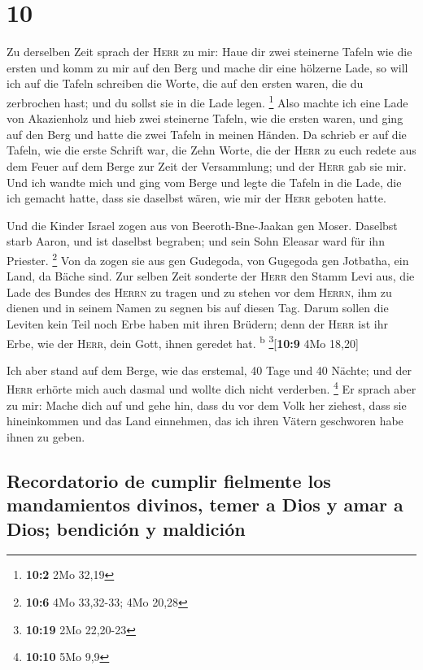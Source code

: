 \hypertarget{section-9}{%
\section{10}\label{section-9}}

 Zu derselben Zeit sprach der \textsc{Herr} zu mir: Haue
dir zwei steinerne Tafeln wie die ersten und komm zu mir auf den Berg
und mache dir eine hölzerne Lade,  so will ich auf die
Tafeln schreiben die Worte, die auf den ersten waren, die du zerbrochen
hast; und du sollst sie in die Lade legen. \footnote{\textbf{10:2} 2Mo
  32,19}  Also machte ich eine Lade von Akazienholz und
hieb zwei steinerne Tafeln, wie die ersten waren, und ging auf den Berg
und hatte die zwei Tafeln in meinen Händen.  Da schrieb er
auf die Tafeln, wie die erste Schrift war, die Zehn Worte, die der
\textsc{Herr} zu euch redete aus dem Feuer auf dem Berge zur Zeit der
Versammlung; und der \textsc{Herr} gab sie mir.  Und ich
wandte mich und ging vom Berge und legte die Tafeln in die Lade, die ich
gemacht hatte, dass sie daselbst wären, wie mir der \textsc{Herr}
geboten hatte.

 Und die Kinder Israel zogen aus von Beeroth-Bne-Jaakan
gen Moser. Daselbst starb Aaron, und ist daselbst begraben; und sein
Sohn Eleasar ward für ihn Priester. \footnote{\textbf{10:6} 4Mo
  33,32-33; 4Mo 20,28}  Von da zogen sie aus gen Gudegoda,
von Gugegoda gen Jotbatha, ein Land, da Bäche sind.  Zur
selben Zeit sonderte der \textsc{Herr} den Stamm Levi aus, die Lade des
Bundes des \textsc{Herrn} zu tragen und zu stehen vor dem
\textsc{Herrn}, ihm zu dienen und in seinem Namen zu segnen bis auf
diesen Tag.  Darum sollen die Leviten kein Teil noch Erbe
haben mit ihren Brüdern; denn der \textsc{Herr} ist ihr Erbe, wie der
\textsc{Herr}, dein Gott, ihnen geredet hat. \textsuperscript{b}
\footnote{\textbf{10:19} 2Mo 22,20-23}{[}\textbf{10:9} 4Mo 18,20{]}

 Ich aber stand auf dem Berge, wie das erstemal, 40 Tage
und 40 Nächte; und der \textsc{Herr} erhörte mich auch dasmal und wollte
dich nicht verderben. \footnote{\textbf{10:10} 5Mo 9,9} 
Er sprach aber zu mir: Mache dich auf und gehe hin, dass du vor dem Volk
her ziehest, dass sie hineinkommen und das Land einnehmen, das ich ihren
Vätern geschworen habe ihnen zu geben.

\hypertarget{recordatorio-de-cumplir-fielmente-los-mandamientos-divinos-temer-a-dios-y-amar-a-dios-bendiciuxf3n-y-maldiciuxf3n}{%
\subsection{Recordatorio de cumplir fielmente los mandamientos divinos,
temer a Dios y amar a Dios; bendición y
maldición}\label{recordatorio-de-cumplir-fielmente-los-mandamientos-divinos-temer-a-dios-y-amar-a-dios-bendiciuxf3n-y-maldiciuxf3n}}

